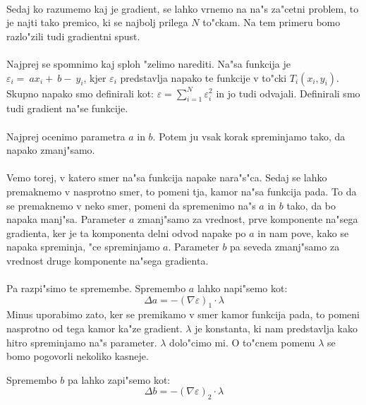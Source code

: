\paragraph{}
Sedaj ko razumemo kaj je gradient, se lahko vrnemo na na"s za"cetni problem, to je najti tako premico, ki se najbolj prilega $N$ to"ckam. Na tem primeru bomo razlo"zili tudi gradientni spust.

\paragraph{}
Najprej se spomnimo kaj sploh "zelimo narediti. Na"sa funkcija je $\varepsilon_i = ~ax_i + ~b - ~y_i$, kjer $\varepsilon_i$ predstavlja napako te funkcije v to"cki $T_i(x_i, y_i)$. Skupno napako smo definirali kot: $\varepsilon = \sum_{i=1}^{N} \varepsilon_i^2$ in jo tudi odvajali. Definirali smo tudi gradient na"se funkcije.


\paragraph{}
Najprej ocenimo parametra $a$ in $b$. Potem ju vsak korak spreminjamo tako, da napako zmanj"samo.

\paragraph{}
Vemo torej, v katero smer na"sa funkcija napake nara"s"ca. Sedaj se lahko premaknemo v nasprotno smer, to pomeni tja, kamor na"sa funkcija pada. To da se premaknemo v neko smer, pomeni da spremenimo na"s $a$ in $b$ tako, da bo napaka manj"sa. Parameter $a$ zmanj"samo za vrednost, prve komponente na"sega gradienta, ker je ta komponenta delni odvod napake po $a$ in nam pove, kako se napaka spreminja, "ce spreminjamo $a$. Parameter $b$ pa seveda zmanj"samo za vrednost druge komponente na"sega gradienta.

\paragraph{}
Pa razpi"simo te spremembe. Spremembo $a$ lahko napi"semo kot:
\[\Delta a = -(\nabla \varepsilon)_1 \cdot \lambda\]
Minus uporabimo zato, ker se premikamo v smer kamor funkcija pada, to pomeni nasprotno od tega kamor ka"ze gradient. $\lambda$ je konstanta, ki nam predstavlja kako hitro spreminjamo na"s parameter. $\lambda$ dolo"cimo mi. O to"cnem pomenu $\lambda$ se bomo pogovorli nekoliko kasneje.

Spremembo $b$ pa lahko zapi"semo kot:
\[\Delta b = -(\nabla \varepsilon)_2 \cdot \lambda\]

